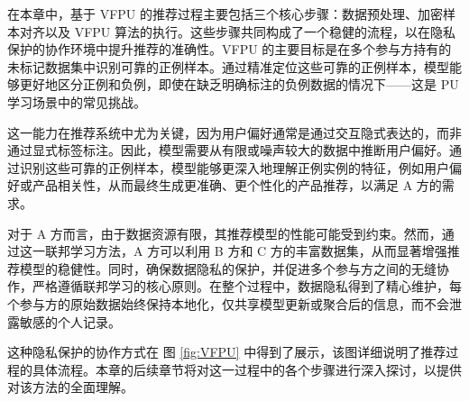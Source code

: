 在本章中，基于 VFPU 的推荐过程主要包括三个核心步骤：数据预处理、加密样本对齐以及 VFPU 算法的执行。这些步骤共同构成了一个稳健的流程，以在隐私保护的协作环境中提升推荐的准确性。VFPU 的主要目标是在多个参与方持有的未标记数据集中识别可靠的正例样本。通过精准定位这些可靠的正例样本，模型能够更好地区分正例和负例，即使在缺乏明确标注的负例数据的情况下——这是 PU 学习场景中的常见挑战。

这一能力在推荐系统中尤为关键，因为用户偏好通常是通过交互隐式表达的，而非通过显式标签标注。因此，模型需要从有限或噪声较大的数据中推断用户偏好。通过识别这些可靠的正例样本，模型能够更深入地理解正例实例的特征，例如用户偏好或产品相关性，从而最终生成更准确、更个性化的产品推荐，以满足 A 方的需求。

对于 A 方而言，由于数据资源有限，其推荐模型的性能可能受到约束。然而，通过这一联邦学习方法，A 方可以利用 B 方和 C 方的丰富数据集，从而显著增强推荐模型的稳健性。同时，确保数据隐私的保护，并促进多个参与方之间的无缝协作，严格遵循联邦学习的核心原则。在整个过程中，数据隐私得到了精心维护，每个参与方的原始数据始终保持本地化，仅共享模型更新或聚合后的信息，而不会泄露敏感的个人记录。

这种隐私保护的协作方式在 图 \ref{fig:VFPU} 中得到了展示，该图详细说明了推荐过程的具体流程。本章的后续章节将对这一过程中的各个步骤进行深入探讨，以提供对该方法的全面理解。


